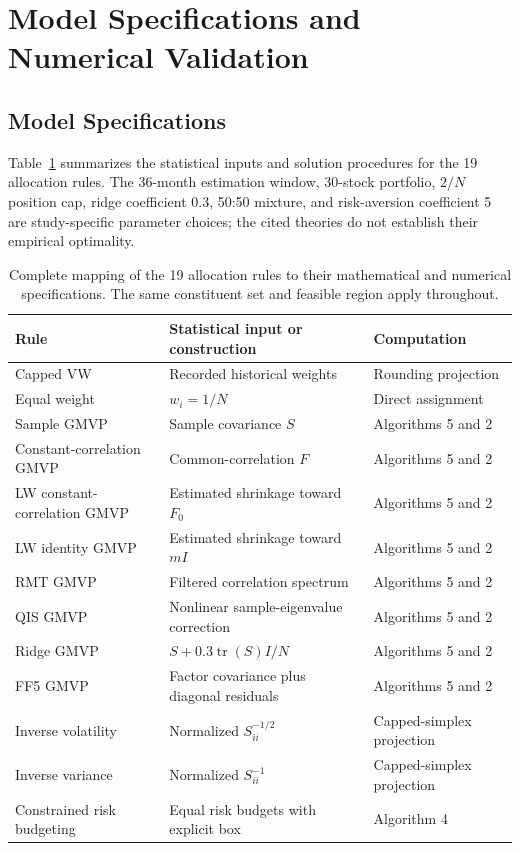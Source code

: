 \documentclass[letterpaper,journal]{IEEEtran}
\begin{document}
\section{Model Specifications and Numerical Validation}\label{app:replication}
\subsection{Model Specifications}
Table~\ref{tab:methodmap} summarizes the statistical inputs and solution procedures for the 19 allocation rules. The 36-month estimation window, 30-stock portfolio, $2/N$ position cap, ridge coefficient 0.3, 50:50 mixture, and risk-aversion coefficient 5 are study-specific parameter choices; the cited theories do not establish their empirical optimality.

\begin{table}[!tp]\centering
\caption{Complete mapping of the 19 allocation rules to their mathematical and numerical specifications. The same constituent set and feasible region apply throughout.}\label{tab:methodmap}
\small\begin{tabular}{lll}\toprule
Rule & Statistical input or construction & Computation\\\midrule
Capped VW & Recorded historical weights & Rounding projection\\
Equal weight & $w_i=1/N$ & Direct assignment\\
Sample GMVP & Sample covariance $S$ & Algorithms 5 and 2\\
Constant-correlation GMVP & Common-correlation $F$ & Algorithms 5 and 2\\
LW constant-correlation GMVP & Estimated shrinkage toward $F_0$ & Algorithms 5 and 2\\
LW identity GMVP & Estimated shrinkage toward $mI$ & Algorithms 5 and 2\\
RMT GMVP & Filtered correlation spectrum & Algorithms 5 and 2\\
QIS GMVP & Nonlinear sample-eigenvalue correction & Algorithms 5 and 2\\
Ridge GMVP & $S+0.3\operatorname{tr}(S)I/N$ & Algorithms 5 and 2\\
FF5 GMVP & Factor covariance plus diagonal residuals & Algorithms 5 and 2\\
Inverse volatility & Normalized $S_{ii}^{-1/2}$ & Capped-simplex projection\\
Inverse variance & Normalized $S_{ii}^{-1}$ & Capped-simplex projection\\
Constrained risk budgeting & Equal risk budgets with explicit box & Algorithm 4\\

\end{tabular}
\end{table}
\end{document}

